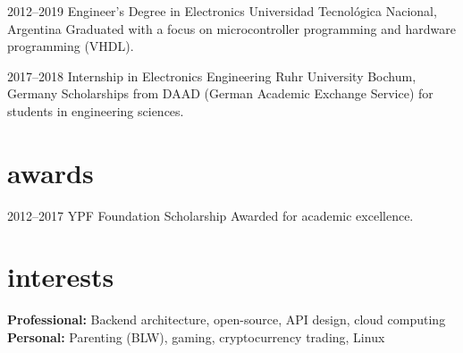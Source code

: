 \documentclass[a4paper,nocolors]{friggeri-cv}
\begin{document}
\begin{entrylist}


\entry
{2012--2019}
{Engineer’s Degree {\normalfont in Electronics}}
{Universidad Tecnológica Nacional, Argentina}
{Graduated with a focus on microcontroller programming and hardware programming (VHDL).}


\entry
{2017--2018}
{Internship {\normalfont in Electronics Engineering}}
{Ruhr University Bochum, Germany}
{Scholarships from DAAD (German Academic Exchange Service) for students in engineering sciences.}

\end{entrylist}


\section{awards}

\begin{entrylist}


\entry
{2012–2017}
{YPF Foundation Scholarship}
{Awarded for academic excellence.}

\end{entrylist}


\section{interests}

\textbf{Professional:} Backend architecture, open-source, API design, cloud computing\\
\textbf{Personal:} Parenting (BLW), gaming, cryptocurrency trading, Linux
\end{document}
